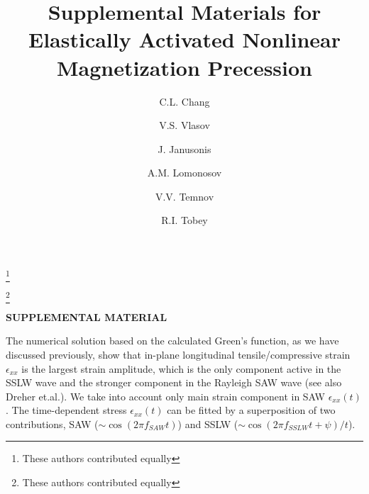 \documentclass[preprint,superscriptaddress]{revtex4}
\begin{document}
\title{Supplemental Materials for Elastically Activated Nonlinear Magnetization Precession}

\author{C.L. Chang}
\thanks{These authors contributed equally}
\author{V.S. Vlasov}
\thanks{These authors contributed equally}
\author{J. Janusonis}
\author{A.M. Lomonosov}
\author{V.V. Temnov}
\author{R.I. Tobey}
\maketitle
{\bf SUPPLEMENTAL MATERIAL}

The numerical solution based on the calculated Green's
function, as we have discussed previously\cite{Janusonis2016}, show that 
in-plane longitudinal tensile/compressive strain $\epsilon_{xx}$ is the largest strain amplitude, which 
is the only component active in the SSLW wave and the stronger component in the 
Rayleigh SAW wave (see also Dreher et.al.\cite{Dreher}).
We take into account only main strain component in SAW $\epsilon_{xx}(t)$. The time-dependent stress $\epsilon_{xx}(t)$ can
be fitted by a superposition of two contributions, SAW
($\sim\cos(2\pi f_{SAW}t)$) and SSLW
($\sim\cos(2\pi f_{SSLW}t+\psi)/t$).
\end{document}
